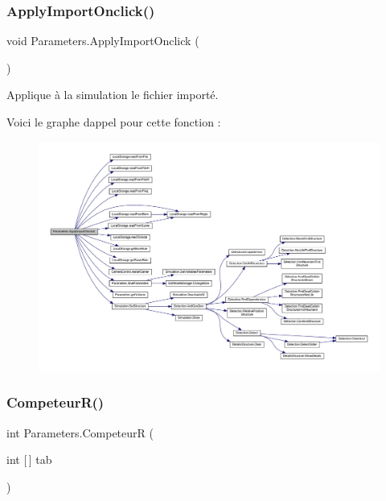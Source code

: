 \subsubsection{\texorpdfstring{Apply\+Import\+Onclick()}{ApplyImportOnclick()}}
{\footnotesize\ttfamily void Parameters.\+Apply\+Import\+Onclick (\begin{DoxyParamCaption}{ }\end{DoxyParamCaption})\hspace{0.3cm}{\ttfamily [inline]}}



Applique à la simulation le fichier importé. 

Voici le graphe d\textquotesingle{}appel pour cette fonction \+:
\nopagebreak
\begin{figure}[H]
\begin{center}
\leavevmode
\includegraphics[width=350pt]{class_parameters_a8438e2686a572fc6d1cc2947489da01d_cgraph}
\end{center}
\end{figure}
\mbox{\label{class_parameters_a9eb50f6a67cb480f303e5d6f91997f7d}} 
\subsubsection{\texorpdfstring{Competeur\+R()}{CompeteurR()}}
{\footnotesize\ttfamily int Parameters.\+CompeteurR (\begin{DoxyParamCaption}\item[{int \mbox{[}$\,$\mbox{]}}]{tab }\end{DoxyParamCaption})\hspace{0.3cm}{\ttfamily [inline]}}



